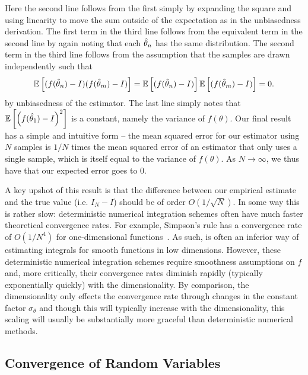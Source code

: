 Here the second line follows from the first simply by expanding the square and using linearity
to move the sum outside of the expectation as in the unbiasedness derivation.
The first term in the third line follows from the equivalent term in the second line by again noting that
each $\hat{\theta}_n$ has the same distribution.  The second term in the third line
follows from the assumption that the samples are drawn independently such that
\[
\mathbb{E}\left[ (f(\hat{\theta}_n)-I)(f(\hat{\theta}_m)-I)\right] = \mathbb{E}\left[ (f(\hat{\theta}_n)-I)\right] \mathbb{E}\left[(f(\hat{\theta}_m)-I)\right]=0.
\]
by unbiasedness of the estimator. The last line simply notes that $\mathbb{E}\left[ \left(f(\hat{\theta}_1)-I\right)^2\right]$ is a constant,
namely the variance of $f(\theta)$.
  Our final result has a simple and intuitive form -- the mean squared error for
our estimator using $N$ samples is $1/N$ times the mean squared error of an estimator that only uses
a single sample, which is itself equal to the variance of $f(\theta)$.  As $N\rightarrow\infty$, we thus
have that our expected error goes to $0$.

A key upshot of this result is that the difference between our empirical estimate and the true value (i.e. $I_N-I$)
 should be of order $O(1/\sqrt{N})$.  In some way this is rather slow: deterministic numerical
integration schemes often have much faster theoretical convergence rates.  For example,
Simpson's rule has a convergence rate of $O(1/N^4)$ for one-dimensional functions~\citep[Chapter 7]{owen2013mc}.  
As such, \mc is often an inferior way of estimating integrals for smooth functions
in low dimensions.  However, these deterministic numerical integration schemes
require smoothness assumptions on $f$ and, more critically, their convergence rates diminish rapidly (typically
exponentially quickly) with the dimensionality.   
By comparison, the dimensionality only effects the \mc convergence rate through changes in the 
constant factor $\sigma_{\theta}$
and though this will typically increase with the dimensionality, this 
scaling will usually be substantially more graceful than deterministic numerical methods.

\subsection{Convergence of Random Variables}
\label{sec:inf:mc:conv}


